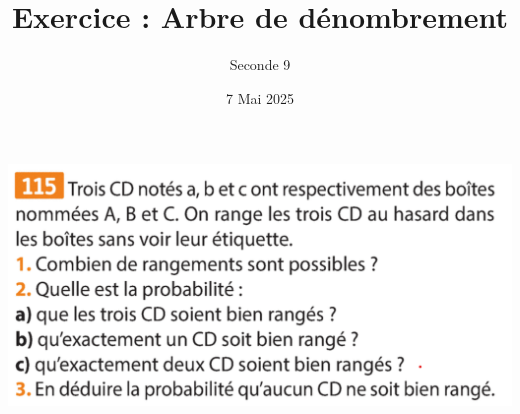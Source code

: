 \documentclass{article}
\title{Exercice : Arbre de dénombrement}
\date{7 Mai 2025}
\author{Seconde 9}
\begin{document}
\maketitle
\begin{center}
\includegraphics[width=\textwidth]{Exercice.png}
\end{center}
\end{document}
